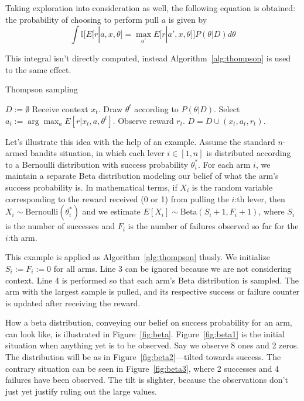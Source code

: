 \documentclass{article} %
\begin{document}
Taking exploration into consideration as well, the following equation is
obtained: the probability of choosing to perform pull $a$ is given by
\begin{equation}
  \int \mathbb{I}\bigg[E[r|a,x,\theta] = \max_{a'}
  E\big[r|a',x,\theta\big]\bigg] P(\theta | D) d\theta
\end{equation}

This integral isn't directly computed, instead Algorithm~\ref{alg:thompson} is
used to the same effect.

\begin{algorithm}
  \caption{Thompson sampling \cite{chapelle2011empirical}}
  \label{alg:thompson}
  \begin{algorithmic}[1]
    \State $D := \emptyset$
      \State Receive context $x_t$.
      \State Draw $\theta^t$ according to $P(\theta | D)$.
      \State Select $a_t := \arg\max_a E[r | x_t, a, \theta^t]$.
      \State Observe reward $r_t$.
      \State $D = D \cup (x_t, a_t, r_t)$.
    \EndFor
  \end{algorithmic}
\end{algorithm}

Let's illustrate this idea with the help of an example. Assume the standard
$n$-armed bandits situation, in which each lever $i \in [1,n]$ is distributed
according to a Bernoulli distribution with success probability $\theta^*_i$.
For each arm $i$, we maintain a separate Beta distribution modeling our belief
of what the arm's success probability is. In mathematical terms, if $X_i$ is
the random variable corresponding to the reward received (0 or 1) from pulling
the $i$:th lever, then $X_i \sim \text{Bernoulli}(\theta^*_i)$  and we estimate
$E[X_i] \sim \text{Beta}(S_i + 1, F_i + 1)$, where $S_i$ is the number of
successes and $F_i$ is the number of failures observed so far for the $i$:th
arm.

This example is applied as Algorithm~\ref{alg:thompson} thusly. We initialize
$S_i := F_i := 0$ for all arms. Line 3 can be ignored because we are not
considering context. Line 4 is performed so that each arm's Beta distribution
is sampled.  The arm with the largest sample is pulled, and its respective
success or failure counter is updated after receiving the reward.

How a beta distribution, conveying our belief on success probability for an
arm, can look like, is illustrated in Figure~\ref{fig:beta}.
Figure~\ref{fig:beta1} is the initial situation when anything yet is to be
observed. Say we observe 8 ones and 2 zeros. The distribution will be as in
Figure~\ref{fig:beta2}---tilted towards success. The contrary situation can be
seen in Figure~\ref{fig:beta3}, where 2 successes and 4 failures have been
observed. The tilt is slighter, because the observations don't just yet justify
ruling out the large values.
\end{document}
